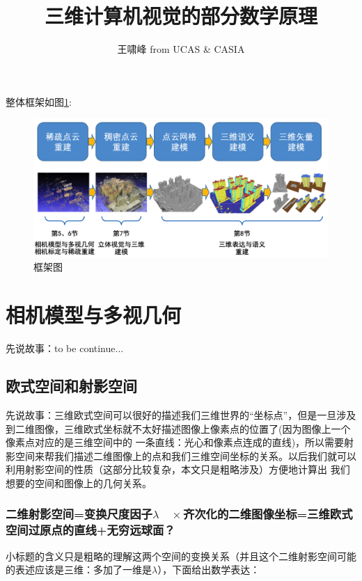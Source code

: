 \documentclass[12pt]{article}
\begin{document}
%
%

\title{三维计算机视觉的部分数学原理}
\author{王啸峰 from UCAS \& CASIA} %

\maketitle
整体框架如图\ref{fig:framwork}:
\begin{figure}[ht]
    \centering
    \includegraphics[scale=0.6]{./img/framwork.png}
    \caption{框架图}
    \label{fig:framwork}
\end{figure}

\section{相机模型与多视几何}
先说故事：to be continue...
\subsection{欧式空间和射影空间}
先说故事：三维欧式空间可以很好的描述我们三维世界的“坐标点”，但是一旦涉及到二维图像，三维欧式坐标就不太好描述图像上像素点的位置了(因为图像上一个像素点对应的是三维空间中的
一条直线：光心和像素点连成的直线)，所以需要射影空间来帮我们描述二维图像上的点和我们三维空间坐标的关系。以后我们就可以利用射影空间的性质（这部分比较复杂，本文只是粗略涉及）方便地计算出
我们想要的空间和图像上的几何关系。

\subsubsection{二维射影空间=变换尺度因子$\lambda \quad \times$齐次化的二维图像坐标=三维欧式空间过原点的直线+无穷远球面？}
小标题的含义只是粗略的理解这两个空间的变换关系（并且这个二维射影空间可能的表述应该是三维：多加了一维是$\lambda$），下面给出数学表达：
\end{document}
